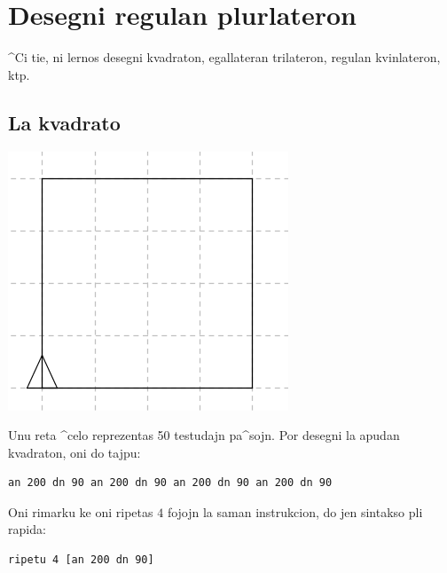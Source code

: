 \section{Desegni regulan plurlateron}
\noindent ^Ci tie, ni lernos desegni kvadraton, egallateran
trilateron, regulan kvinlateron, ktp.
\subsection{La kvadrato}
\begin{center}
\includegraphics{bildoj/bases-carre.png}
\end{center}
\noindent Unu reta ^celo reprezentas 50 testudajn pa^sojn.  Por
desegni la apudan kvadraton, oni do tajpu:
\begin{verbatim}
an 200 dn 90 an 200 dn 90 an 200 dn 90 an 200 dn 90
\end{verbatim}
Oni rimarku ke oni ripetas $4$ fojojn la saman instrukcion, do jen
sintakso pli rapida:
\begin{verbatim}
ripetu 4 [an 200 dn 90]
\end{verbatim}
